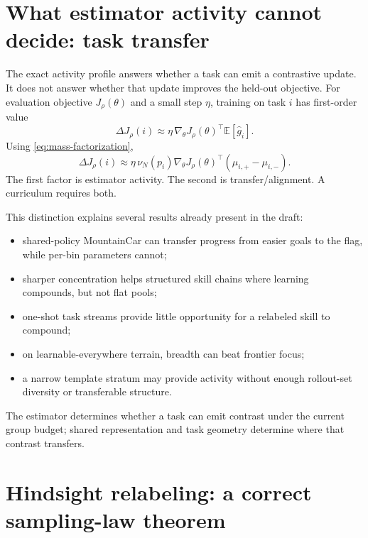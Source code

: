 \documentclass[11pt]{article}
\newcommand{\E}{\mathbb{E}}
\newcommand{\grad}{\nabla_{\!\theta}}
\theoremstyle{definition}
\theoremstyle{remark}
\begin{document}
\section{What estimator activity cannot decide: task transfer}

The exact activity profile answers whether a task can emit a contrastive update. It does not answer whether that update improves the held-out objective. For evaluation objective $J_\rho(\theta)$ and a small step $\eta$, training on task $i$ has first-order value
\begin{equation}
\Delta J_\rho(i)
\approx
\eta\,\grad J_\rho(\theta)^{\!\top}
\E[\widehat g_i].
\label{eq:transfer-value}
\end{equation}
Using \cref{eq:mass-factorization},
\begin{equation}
\Delta J_\rho(i)
\approx
\eta\,\nu_N(p_i)
\grad J_\rho(\theta)^{\!\top}
\left(\mu_{i,+}-\mu_{i,-}\right).
\label{eq:activity-transfer}
\end{equation}
The first factor is estimator activity. The second is transfer/alignment. A curriculum requires both.

This distinction explains several results already present in the draft:

\begin{itemize}[leftmargin=2em]
\item shared-policy MountainCar can transfer progress from easier goals to the flag, while per-bin parameters cannot;
\item sharper concentration helps structured skill chains where learning compounds, but not flat pools;
\item one-shot task streams provide little opportunity for a relabeled skill to compound;
\item on learnable-everywhere terrain, breadth can beat frontier focus;
\item a narrow template stratum may provide activity without enough rollout-set diversity or transferable structure.
\end{itemize}

\begin{rewritebox}
The estimator determines whether a task can emit contrast under the current group budget; shared representation and task geometry determine where that contrast transfers.
\end{rewritebox}

\section{Hindsight relabeling: a correct sampling-law theorem}
\label{sec:hindsight}
\end{document}
